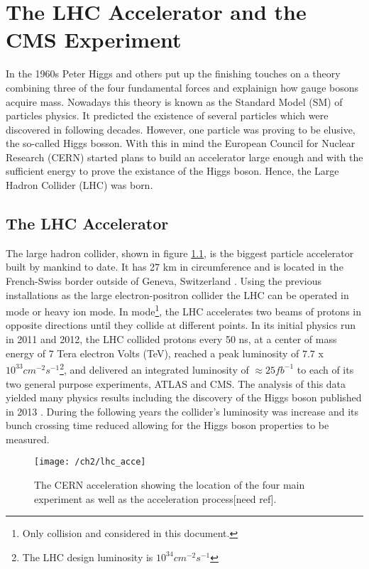 
\chapter{The LHC Accelerator and the CMS Experiment}\label{ch:lhcandcms}
In the 1960s Peter Higgs \cite{peter_higgs}  and others \cite{other_1,other_2} put up the finishing touches on a theory combining three of the four fundamental forces and explainign how gauge bosons acquire mass. Nowadays this theory is known as the Standard Model (SM) of particles physics. It predicted the existence of several particles which were discovered in following decades. However, one particle was proving to be elusive, the so-called Higgs bosson. With this in mind the European Council for Nuclear Research (CERN) started plans to build an accelerator large enough and with the sufficient energy to prove the existance of the Higgs boson. Hence, the Large Hadron Collider (LHC) was born. 

\section{The LHC Accelerator}
The large hadron collider, shown in figure \ref{cern_fac}, is the biggest particle accelerator built by mankind to date. It has 27 km in circumference and is located in the French-Swiss border outside of Geneva, Switzerland \cite{lhc}. Using the previous installations as the large electron-positron collider the LHC can be operated in \pp mode or heavy ion mode. In \pp mode\footnote{Only \pp collision and considered in this document.}, the LHC accelerates two beams of protons in opposite directions until they collide at different points. In its initial physics run in 2011 and 2012, the LHC collided protons every 50 ns, at a center of mass energy of 7 Tera electron Volts (TeV), reached a peak luminosity of $ 7.7$ x $10^{33} cm^{-2} s^{-1}$\footnote{The LHC design luminosity is $10^{34} cm^{-2} s^{-1}$}, and delivered an integrated luminosity of $\approx 25 fb^{-1}$ to each of its two general purpose experiments, ATLAS and CMS. The analysis of this data yielded many physics results including the discovery of the Higgs boson published in 2013 \cite{atlas_higgs,cms_higgs}. During the following years the collider's luminosity was increase and its bunch crossing time reduced allowing for the Higgs boson properties to be measured. 

\begin{figure}[!t]
	\centering
	\texttt{[image: /ch2/lhc\_acce]}
	\caption[The CERN acceleration ]{The CERN acceleration  showing the location of the four main experiment as well as the acceleration process[need ref].}
	\label{cern_fac}
\end{figure}

